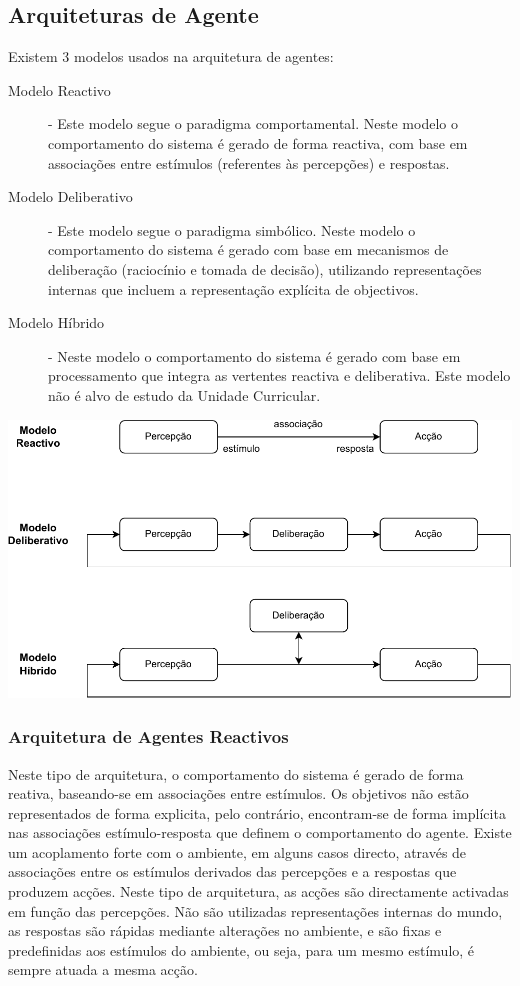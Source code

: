\documentclass[a4paper,12pt]{article}
\begin{document}
\subsection{Arquiteturas de Agente}
Existem 3 modelos usados na arquitetura de agentes:
\begin{description}
	\item[Modelo Reactivo] - Este modelo segue o paradigma comportamental. Neste modelo o comportamento do sistema é gerado de forma reactiva, com base em associações entre estímulos (referentes às percepções) e respostas.
	\item[Modelo Deliberativo] - Este modelo segue o paradigma simbólico. Neste modelo o comportamento do sistema é gerado com base em mecanismos de deliberação (raciocínio e tomada de decisão), utilizando representações internas que incluem a representação explícita de objectivos.
	\item[Modelo Híbrido] - Neste modelo o comportamento do sistema é gerado com base em processamento que integra as vertentes reactiva e deliberativa. Este modelo não é alvo de estudo da Unidade Curricular.
\end{description}

\includegraphics[scale=0.8]{modelos}

\newpage
\subsubsection{Arquitetura de Agentes Reactivos}
Neste tipo de arquitetura, o comportamento do sistema é gerado de forma reativa, baseando-se em associações entre estímulos. Os objetivos não estão representados de forma explicita, pelo contrário, encontram-se de forma implícita nas associações estímulo-resposta que definem o comportamento do agente.
Existe um acoplamento forte com o ambiente, em alguns casos directo, através de associações entre os estímulos derivados das percepções e a respostas que produzem acções.
Neste tipo de arquitetura, as acções são directamente activadas em função das percepções. Não são utilizadas representações internas do mundo, as respostas são rápidas mediante alterações no ambiente, e são fixas e predefinidas aos estímulos do ambiente, ou seja, para um mesmo estímulo, é sempre atuada a mesma acção.
\end{document}
